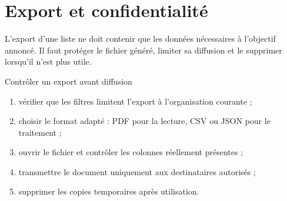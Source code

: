 \section{Export et confidentialité}

L'export d'une liste ne doit contenir que les données nécessaires à l'objectif
annoncé. Il faut protéger le fichier généré, limiter sa diffusion et le
supprimer lorsqu'il n'est plus utile.


\begin{procedurebox}{Contrôler un export avant diffusion}
  \begin{enumerate}[leftmargin=*]
    \item vérifier que les filtres limitent l'export à l'organisation courante ;
    \item choisir le format adapté : PDF pour la lecture, CSV ou JSON pour le
    traitement ;
    \item ouvrir le fichier et contrôler les colonnes réellement présentes ;
    \item transmettre le document uniquement aux destinataires autorisés ;
    \item supprimer les copies temporaires après utilisation.
  \end{enumerate}
\end{procedurebox}
